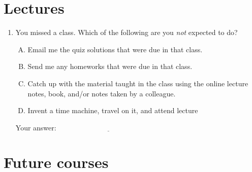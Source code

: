 \documentclass[10pt]{amsart}
\begin{document}
\section{Lectures}

\begin{enumerate}
\item You missed a class. Which of the following are you {\em not}
  expected to do?

  \begin{enumerate}[(A)]
  \item Email me the quiz solutions that were due in that class.
  \item Send me any homeworks that were due in that class.
  \item Catch up with the material taught in the class using the
    online lecture notes, book, and/or notes taken by a colleague.
  \item Invent a time machine, travel on it, and attend lecture
  \end{enumerate}

  \vspace{0.1in}
  Your answer: $\underline{\qquad\qquad\qquad\qquad\qquad\qquad\qquad}$
  \vspace{0.1in}

\end{enumerate}

\section{Future courses}
\end{document}
